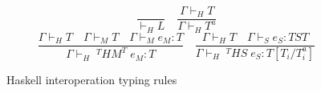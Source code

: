 \begin{figure}[p]
\[
\frac{}{\vdash_{H}L}
\quad
\frac{\Gamma\vdash_{H}T}{\Gamma\vdash_{H}T^{a}}
\]
\bigskip
\[
\frac{\Gamma\vdash_{H}T\quad\Gamma\vdash_{M}T\quad\Gamma\vdash_{M}e_{M}:T}{\Gamma\vdash_{H}\;^{T}HM^{T}\;e_{M}:T}
\quad
\frac{\Gamma\vdash_{H}T\quad\Gamma\vdash_{S}e_{S}:TST}{\Gamma\vdash_{H}\;^{T}HS\;e_{S}:T[T_{i}/T^{a}_{i}]}
\]
\caption{Haskell interoperation typing rules}
\label{hitr}
\end{figure}
